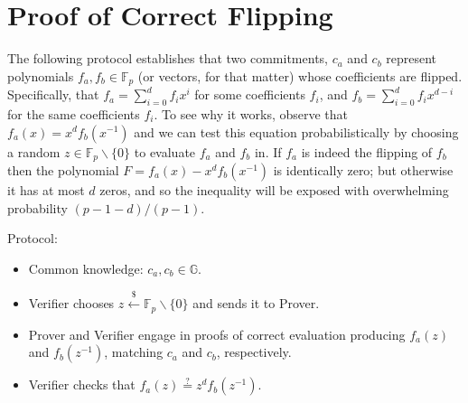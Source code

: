 \documentclass{article}
\begin{document}
\section{Proof of Correct Flipping}

The following protocol establishes that two commitments, $c_a$ and $c_b$ represent polynomials $f_a, f_b \in \mathbb{F}_p$ (or vectors, for that matter) whose coefficients are flipped. Specifically, that $f_a = \sum_{i=0}^{d}f_i x^i$ for some coefficients $f_i$, and $f_b = \sum_{i=0}^df_ix^{d-i}$ for the same coefficients $f_i$. To see why it works, observe that $f_a(x) = x^df_b(x^{-1})$ and we can test this equation probabilistically by choosing a random $z \in \mathbb{F}_p \backslash \{0\}$ to evaluate $f_a$ and $f_b$ in. If $f_a$ is indeed the flipping of $f_b$ then the polynomial $F = f_a(x) - x^df_b(x^{-1})$ is identically zero; but otherwise it has at most $d$ zeros, and so the inequality will be exposed with overwhelming probability $(p-1-d)/(p-1)$.

Protocol:
\begin{itemize}
    \item Common knowledge: $c_a, c_b \in \mathbb{G}$.
    \item Verifier chooses $z \xleftarrow{\$} \mathbb{F}_p \backslash \{0\}$ and sends it to Prover.
    \item Prover and Verifier engage in proofs of correct evaluation producing $f_a(z)$ and $f_b(z^{-1})$, matching $c_a$ and $c_b$, respectively.
    \item Verifier checks that $f_a(z) \stackrel{?}{=} z^d f_b(z^{-1})$.
\end{itemize}
\end{document}
